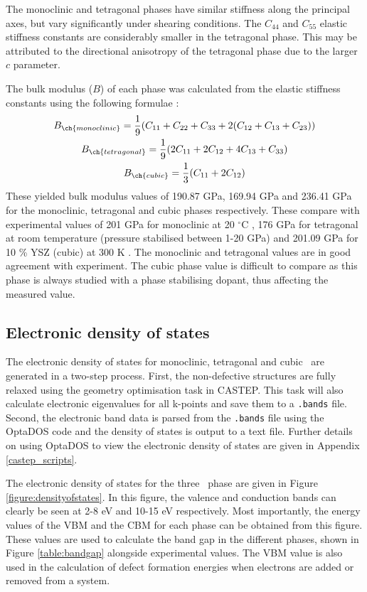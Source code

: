 The monoclinic and tetragonal phases have similar stiffness along the principal axes, but vary significantly under shearing conditions. The $C_{44}$ and $C_{55}$ elastic stiffness constants are considerably smaller in the tetragonal phase. This may be attributed to the directional anisotropy of the tetragonal phase due to the larger $c$ parameter. 

The bulk modulus ($B$) of each phase was calculated from the elastic stiffness constants using the following formulae \cite{Watt1980, Wu2018, wu2017critical}:
\begin{gather}
B_{\ch{monoclinic}} = \frac{1}{9}(C_{11} + C_{22} + C_{33} + 2(C_{12} + C_{13} + C_{23})) \\
B_{\ch{tetragonal}} = \frac{1}{9}(2C_{11} + 2C_{12} + 4C_{13} + C_{33}) \\
B_{\ch{cubic}} = \frac{1}{3}(C_{11} + 2C_{12})
\end{gather}
These yielded bulk modulus values of 190.87 GPa, 169.94 GPa and 236.41 GPa for the monoclinic, tetragonal and cubic phases respectively. These compare with experimental values of 201 GPa for monoclinic at 20 $^{\circ}$C \cite{Chan1991}, 176 GPa for tetragonal at room temperature (pressure stabilised between 1-20 GPa) \cite{Bouvier2000} and 201.09 GPa for 10 \% YSZ (cubic) at 300 K \cite{Cai1995}. The monoclinic and tetragonal values are in good agreement with experiment. The cubic phase value is difficult to compare as this phase is always studied with a phase stabilising dopant, thus affecting the measured value.

\subsection{Electronic density of states} 

The electronic density of states for monoclinic, tetragonal and cubic \zirconia\ are generated in a two-step process. First, the non-defective structures are fully relaxed using the geometry optimisation task in CASTEP. This task will also calculate electronic eigenvalues for all k-points and save them to a \texttt{.bands} file. Second, the electronic band data is parsed from the \texttt{.bands} file using the OptaDOS code \cite{Nicholls2012, Morris2014} and the density of states is output to a text file. Further details on using OptaDOS to view the electronic density of states are given in Appendix \ref{castep_scripts}.

The electronic density of states for the three \zirconia\ phase are given in Figure \ref{figure:densityofstates}. In this figure, the valence and conduction bands can clearly be seen at 2-8 eV and 10-15 eV respectively. Most importantly, the energy values of the VBM and the CBM for each phase can be obtained from this figure. These values are used to calculate the band gap in the different phases, shown in Figure \ref{table:bandgap} alongside experimental values. The VBM value is also used in the calculation of defect formation energies when electrons are added or removed from a system.


